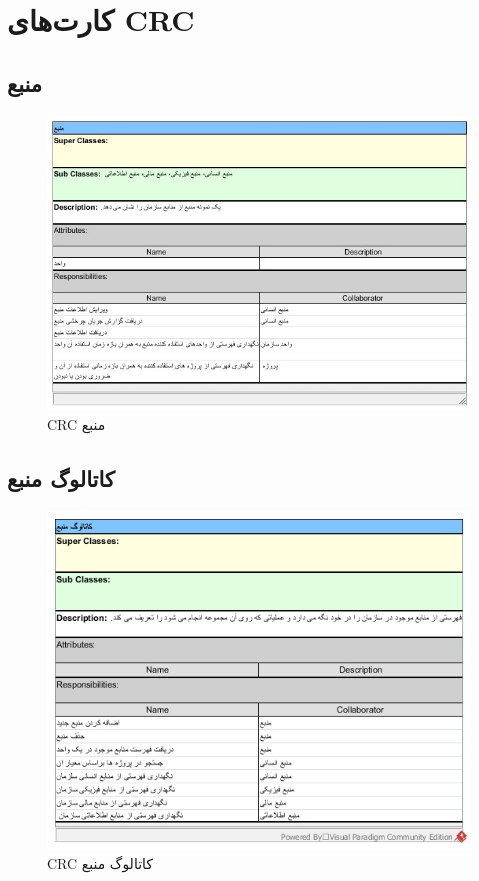 \chapter{کارت‌های CRC}

\section{منبع}
\begin{figure}[H]
	\centering
	\includegraphics[scale=0.8]{img/crc/Resource}
	\caption{CRC منبع }
\end{figure}

\section{کاتالوگ منبع}
\begin{figure}[H]
	\centering
	\includegraphics[scale=0.8]{img/crc/ResourceCatalogue}
	\caption{CRC کاتالوگ منبع }
\end{figure}

